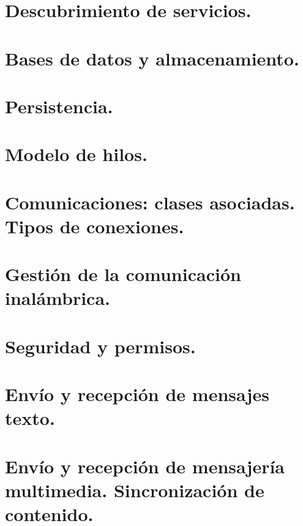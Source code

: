 \documentclass[a4paper,12pt,spanish]{sphinxmanual}
\begin{document}
\section{Descubrimiento de servicios.}
\label{tema2:descubrimiento-de-servicios}

\section{Bases de datos y almacenamiento.}
\label{tema2:bases-de-datos-y-almacenamiento}

\section{Persistencia.}
\label{tema2:persistencia}

\section{Modelo de hilos.}
\label{tema2:modelo-de-hilos}

\section{Comunicaciones: clases asociadas. Tipos de conexiones.}
\label{tema2:comunicaciones-clases-asociadas-tipos-de-conexiones}

\section{Gestión de la comunicación inalámbrica.}
\label{tema2:gestion-de-la-comunicacion-inalambrica}

\section{Seguridad y permisos.}
\label{tema2:seguridad-y-permisos}

\section{Envío y recepción de mensajes texto.}
\label{tema2:envio-y-recepcion-de-mensajes-texto}

\section{Envío y recepción de mensajería multimedia. Sincronización de contenido.}
\label{tema2:envio-y-recepcion-de-mensajeria-multimedia-sincronizacion-de-contenido}
\end{document}
